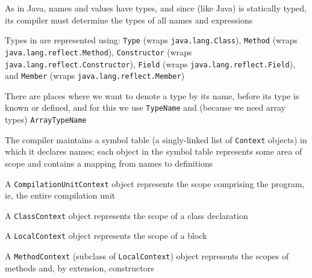 \documentclass[8pt,a4paper,compress]{beamer}
\begin{document}
\begin{frame}[fragile]
\pause

An AST for the \lstinline{HelloWorld} program

\begin{center}
}
\end{center}
\end{frame}

\begin{frame}[fragile]
\pause

As in Java, \jmm names and values have types, and since \jmm (like Java) is statically typed, its compiler must determine the types of all names and expressions

\pause
\bigskip

Types in \jmm are represented using: \lstinline{Type} (wraps \lstinline{java.lang.Class}), \lstinline{Method} (wraps \lstinline{java.lang.reflect.Method}), \lstinline{Constructor} (wraps \lstinline{java.lang.reflect.Constructor}), \lstinline{Field} (wraps \lstinline{java.lang.reflect.Field}), and \lstinline{Member} (wraps \lstinline{java.lang.reflect.Member})

\pause
\bigskip

There are places where we want to denote a type by its name, before its type is known or defined, and for this we use \lstinline{TypeName} and (because we need array types) \lstinline{ArrayTypeName}

\pause
\bigskip

The \jmm compiler maintains a symbol table (a singly-linked list of \lstinline{Context} objects) in which it declares names; each object in the symbol table represents some area of scope and contains a mapping from names to definitions

\pause
\bigskip

A \lstinline{CompilationUnitContext} object represents the scope comprising the program, ie, the entire compilation unit

\pause
\bigskip

A \lstinline{ClassContext} object represents the scope of a class declaration

\pause
\bigskip

A \lstinline{LocalContext} object represents the scope of a block

\pause
\bigskip

A \lstinline{MethodContext} (subclass of \lstinline{LocalContext}) object represents the scopes of methods and, by extension, constructors
\end{frame}
\end{document}

